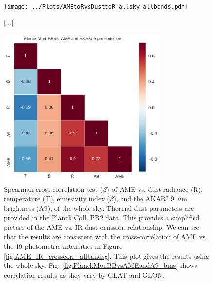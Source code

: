 \documentclass[preprint2,longabstract]{aastex}
\begin{document}
      \begin{figure}
        \label{fig:AMEtoRvsDusttoR_allsky_allbands}
        \texttt{[image: ../Plots/AMEtoRvsDusttoR\_allsky\_allbands.pdf]}
        \centering
        \caption{[...]}
      \end{figure}


      \begin{figure}
        \label{fig:PlanckModBBvsAMEandA9}
        \includegraphics[width=85mm]{../Plots/PlanckModBBvsAMEandA9.pdf}
        \centering
        \caption{Spearman cross-correlation test ($S$) of AME vs. dust radiance (R), temperature (T),  emissivity index ($\beta$), and the AKARI 9~$\mu$m brightness (A9), of the whole sky. Thermal dust parameters are provided in the Planck Coll. PR2 data. This provides a simplified picture of the AME vs. IR dust emission relationship. We can see that the results are consistent with the cross-correlation of AME vs. the 19 photometric intensities in Figure \ref{fig:AME_IR_crosscorr_allbandsg}. This plot gives the results using the whole sky. Fig. \ref{fig:PlanckModBBvsAMEandA9_bins} shows correlation results as they vary by GLAT and GLON. }
      \end{figure}
\end{document}
